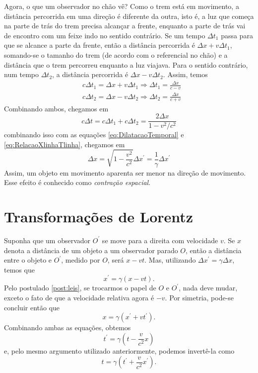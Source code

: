 Agora, o que um observador no chão vê? Como o trem está em movimento, a distância percorrida em uma direção é diferente da outra, isto é, a luz que começa na parte de trás do trem precisa alcançar a frente, enquanto a parte de trás vai de encontro com um feixe indo no sentido contrário. Se um tempo $\Delta t_1$ passa para que se alcance a parte da frente, então a distância percorrida é $\Delta x + v\Delta t_1$, somando-se o tamanho do trem (de acordo com o referencial no chão) e a distância que o trem percorreu enquanto a luz viajava. Para o sentido contrário, num tempo $\Delta t_2$, a distância percorrida é $\Delta x-v\Delta t_2$. Assim, temos 
\begin{align*}
    &c\Delta t_1 = \Delta x + v\Delta t_1 \Rightarrow \Delta t_1 = \frac{\Delta x}{c-v}\\
    &c\Delta t_2 = \Delta x - v\Delta t_2 \Rightarrow \Delta t_2 = \frac{\Delta x}{c+v}
\end{align*}
Combinando ambos, chegamos em
\[
    c\Delta t = c\Delta t_1 + c\Delta t_2 = \frac{2\Delta x}{1-v^2/c^2}
\]
combinando isso com as equações \eqref{eq:DilatacaoTemporal} e \eqref{eq:RelacaoXlinhaTlinha}, chegamos em
\begin{equation}\label{eq:ContracaoEspacial}
    \Delta x = \sqrt{1-\frac{v^2}{c^2}}\Delta x^\prime = \frac{1}{\gamma}\Delta x^\prime
\end{equation}
Assim, um objeto em movimento aparenta ser menor na direção de movimento. Esse efeito é conhecido como \textit{contração espacial}.

\section{Transformações de Lorentz}\label{sec:TransformacoesLorentz}

Suponha que um observador $O^\prime$ se move para a direita com velocidade $v$. Se $x$ denota a distância de um objeto a um observador parado $O$, então a distância entre o objeto e $O^\prime$, medido por $O$, será $x-vt$. Mas, utilizando $\Delta x^\prime = \gamma \Delta x$, temos que
\begin{equation}\label{eq:LorentzX}
    x^\prime = \gamma (x-vt).
\end{equation}
Pelo postulado \ref{post:leis}, se trocarmos o papel de $O$ e $O^\prime$, nada deve mudar, exceto o fato de que a velocidade relativa agora é $-v$. Por simetria, pode-se concluir então que
\begin{equation}\label{eq:LorentzXInversa}
    x = \gamma (x^\prime + vt^\prime) .
\end{equation}
Combinando ambas as equações, obtemos
\begin{equation}\label{eq:LorentzT}
    t^\prime = \gamma \left(t - \frac{v}{c^2}x\right)
\end{equation}
e, pelo mesmo argumento utilizado anteriormente, podemos invertê-la como
\begin{equation}\label{eq:LorentzTInversa}
    t = \gamma \left(t^\prime + \frac{v}{c^2}x^\prime\right) .
\end{equation}

